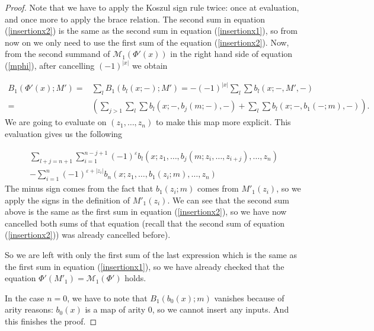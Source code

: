 \documentclass[join.tex]{subfiles}
\begin{document}
\begin{proof}
Note that we have to apply the Koszul sign rule twice: once at evaluation, and once more to apply the brace relation. The second sum in equation (\ref{insertionx2}) is the same as the second sum in equation (\ref{insertionx1}), so from now on we only need to use the first sum of the equation (\ref{insertionx2}). Now, from the second summand of $\mathcal{M}_1(\Phi'(x))$ in the right hand side of equation (\ref{mphi}), after cancelling $(-1)^{|x|}$ we obtain 


\begin{align*}
B_1(\Phi'(x);M')=&\sum_l B_1(b_l(x;-);M')=-(-1)^{|x|}\sum_l\sum b_l(x;-,M',-) \\
=&\left(\sum_{j> 1} \sum_l\sum b_l(x;-,b_j(m;-),-)+\sum_l\sum b_l(x;-,b_1(-;m),-)\right).
\end{align*}
We are going to evaluate on $(z_1,\dots, z_n)$ to make this map more explicit. This evaluation gives us the following
 
 \begin{align*}
 \sum_{l+j=n+1}\sum_{i=1}^{n-j+1}(-1)^{\varepsilon} b_l(x;z_1,\dots,b_j(m;z_{i},\dots, z_{i+j}),\dots, z_n)\\-\sum_{i=1}^{n} (-1)^{\varepsilon+|z_i|}b_n(x;z_1,\dots,b_1(z_{i};m),\dots, z_n)
 \end{align*}
The minus sign comes from the fact that $b_1(z_i;m)$ comes from $M'_1(z_i)$, so we apply the signs in the definition of $M'_1(z_i)$. We can see that the second sum above is the same as the first sum in equation (\ref{insertionx2}), so we have now cancelled both sums of that equation (recall that the second sum of equation (\ref{insertionx2})) was already cancelled before).
 
 So we are left with only the first sum of the last expression which is the same as the first sum in equation (\ref{insertionx1}), so we have already checked that the equation $\Phi'(M'_1)=\mathcal{M}_1(\Phi')$ holds. 
  
 In the case $n=0$, we have to note that $B_1(b_0(x);m)$ vanishes because of arity reasons: $b_0(x)$ is a map of arity 0, so we cannot insert any inputs. And this finishes the proof.
 \end{proof}
 
\end{document}

